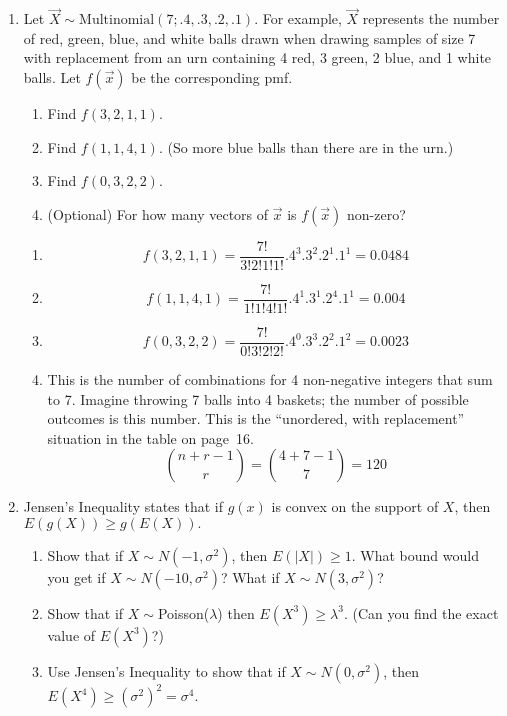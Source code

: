 \documentclass[12pt]{article}
\begin{document}
\begin{enumerate}
\item Let $\vec{X} \sim \text{Multinomial}(7; .4,.3,.2,.1)$.  For
example, $\vec{X}$ represents
the number of red, green, blue, and white balls drawn when drawing samples of size 7
with replacement from an urn containing
4 red, 3 green, 2 blue, and 1 white balls.  Let $f(\vec{x})$ be the corresponding pmf.
  \begin{enumerate}
  \item Find $f(3,2,1,1)$.
  \item Find $f(1,1,4,1)$. (So more blue balls than there are in the urn.)
  \item Find $f(0,3,2,2)$.
  \item (Optional) For how many vectors of $\vec{x}$ is $f(\vec{x})$ non-zero?
  \end{enumerate}

\hrulefill

  \begin{enumerate}
  \item
  \[
  f(3,2,1,1) = \frac{7!}{3!2!1!1!}.4^3 .3^2 .2^1 .1^1 = 0.0484
  \]
  \item
  \[
  f(1,1,4,1) = \frac{7!}{1!1!4!1!}.4^1 .3^1 .2^4 .1^1 = 0.004
  \]
  \item
  \[
  f(0,3,2,2) = \frac{7!}{0!3!2!2!}.4^0 .3^3 .2^2 .1^2 = 0.0023
  \]
  \item
  This is the number of combinations for 4 non-negative integers that
  sum to 7.
  Imagine throwing 7 balls into 4 baskets;
  the number of possible outcomes is this number.
  This is the ``unordered, with replacement'' situation in the table on
  page~16.
  \[
  {n + r - 1 \choose r}
  = {4 + 7 - 1\choose 7}
  = 120
  \]
  \end{enumerate}

\item Jensen's Inequality states that if $g(x)$ is convex on the support of $X$,
 then $E(g(X)) \ge g(E(X)).$
  \begin{enumerate}
  \item Show that if $X \sim N(-1,\sigma^2)$, then $E(|X|)\ge 1.$
  What bound would you get if $X \sim N(-10,\sigma^2)$?  What if $X \sim N(3,\sigma^2)$?
  \item Show that if $X \sim $Poisson($\lambda$) then $E(X^3) \ge \lambda^3.$ (Can you find the
exact value of $E(X^3)$?)
  \item Use Jensen's Inequality to show that if $X \sim N(0,\sigma^2)$,
   then $E(X^4) \ge (\sigma^2)^2 = \sigma^4.$
  \end{enumerate}


\end{enumerate}
\end{document}
